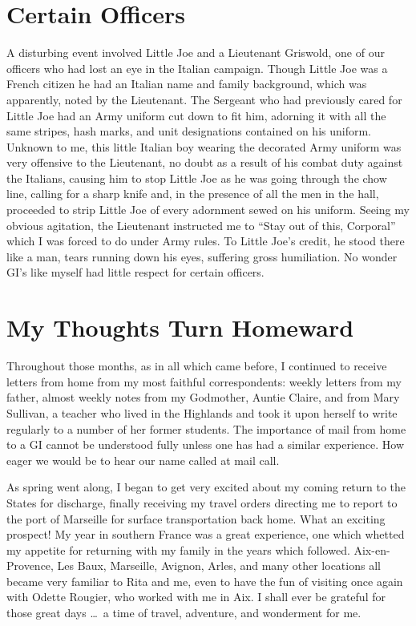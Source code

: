 \documentclass[../m3y]{subfiles}
\begin{document}
\section{Certain Officers}
A disturbing event involved Little Joe and a Lieutenant Griswold, one of our officers who had lost an eye in the Italian campaign. Though Little Joe was a French citizen he had an Italian name and family background, which was apparently, noted by the Lieutenant. The Sergeant who had previously cared for Little Joe had an Army uniform cut down to fit him, adorning it with all the same stripes, hash marks, and unit designations contained on his uniform. Unknown to me, this little Italian boy wearing the decorated Army uniform was very offensive to the Lieutenant, no doubt as a result of his combat duty against the Italians, causing him to stop Little Joe as he was going through the chow line, calling for a sharp knife and, in the presence of all the men in the hall, proceeded to strip Little Joe of every adornment sewed on his uniform. Seeing my obvious agitation, the Lieutenant instructed me to ``Stay out of this, Corporal'' which I was forced to do under Army rules. To Little Joe's credit, he stood there like a man, tears running down his eyes, suffering gross humiliation. No wonder GI's like myself had little respect for certain officers.

\section{My Thoughts Turn Homeward}
Throughout those months, as in all which came before, I continued to receive letters from home from my most faithful correspondents: weekly letters from my father, almost weekly notes from my Godmother, Auntie Claire, and from Mary Sullivan, a teacher who lived in the Highlands and took it upon herself to write regularly to a number of her former students. The importance of mail from home to a GI cannot be understood fully unless one has had a similar experience. How eager we would be to hear our name called at mail call.

As spring went along, I began to get very excited about my coming return to the States for discharge, finally receiving my travel orders directing me to report to the port of Marseille for surface transportation back home. What an exciting prospect! My year in southern France was a great experience, one which whetted my appetite for returning with my family in the years which followed. Aix-en-Provence, Les Baux, Marseille, Avignon, Arles, and many other locations all became very familiar to Rita and me, even to have the fun of visiting once again with Odette Rougier, who worked with me in Aix. I shall ever be grateful for those great days \ldots\ a time of travel, adventure, and wonderment for me.
\end{document}
